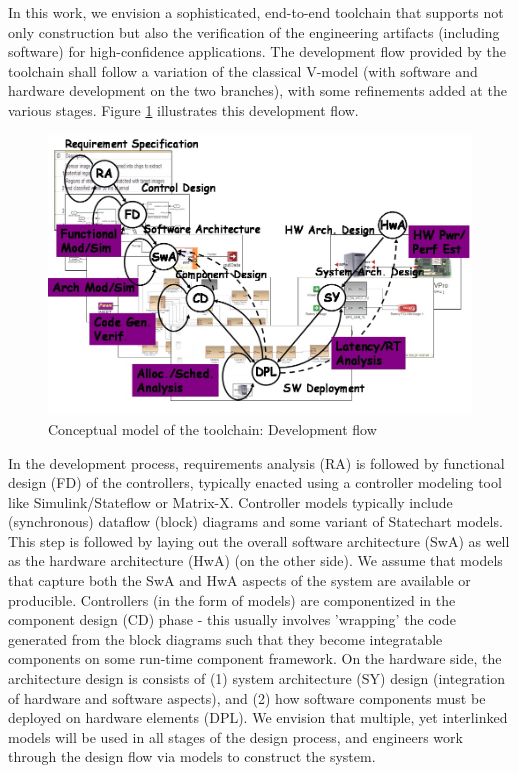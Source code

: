 In this work, we envision a sophisticated, end-to-end toolchain that supports not only construction but also the verification of the engineering artifacts (including software) for high-confidence applications. The development flow provided by the toolchain shall follow a variation of the classical V-model (with software and hardware development on the two branches), with some refinements added at the various stages. Figure \ref{fig:toolchain} illustrates this development flow.

\begin{figure}[h]

   \includegraphics[width=0.9\columnwidth]{toolchain}
   \caption{Conceptual model of the toolchain: Development flow}
   \label{fig:toolchain}
\end{figure}

In the development process, requirements analysis (RA) is followed by functional design (FD) of the controllers, typically enacted using a controller modeling tool like Simulink/Stateflow or Matrix-X. Controller models typically include (synchronous) dataflow (block) diagrams and some variant of Statechart \cite{harel:statecharts} models. This step is followed by laying out the overall software architecture (SwA) as well as the hardware architecture (HwA) (on the other side). We assume that models that capture both the SwA and HwA aspects of the system are available or producible. Controllers (in the form of models) are componentized in the component design (CD) phase - this usually involves 'wrapping' the code generated from the block diagrams such that they become integratable components on some run-time component framework. On the hardware side, the architecture design is consists of (1) system architecture (SY) design (integration of hardware and software aspects), and (2) how software components must be deployed on hardware elements (DPL). We envision that multiple, yet interlinked models will be used in all stages of the design process, and engineers work through the design flow via models to construct the system.

